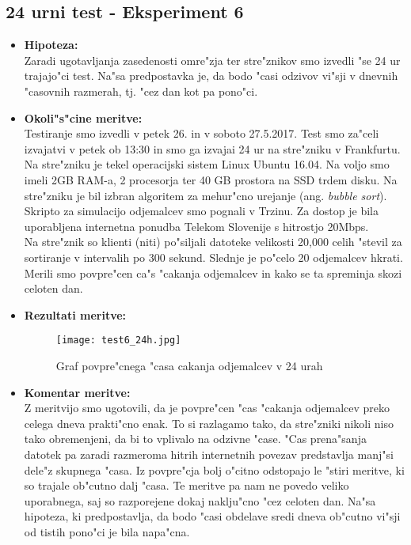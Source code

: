 \newpage
\subsection{24 urni test - Eksperiment 6}
\begin{itemize}
	\item \textbf{Hipoteza: }  \\
		Zaradi ugotavljanja zasedenosti omre"zja ter stre"znikov smo izvedli "se 24 ur trajajo"ci test. Na"sa predpostavka je, da bodo "casi odzivov vi"sji v dnevnih "casovnih razmerah, tj. "cez dan kot pa pono"ci.

	\item \textbf{Okoli"s"cine meritve: } \\
		Testiranje smo izvedli v petek 26. in v soboto 27.5.2017. Test smo za"celi izvajatvi v petek ob 13:30 in smo ga izvajai 24 ur na stre"zniku v Frankfurtu. Na stre"zniku je tekel operacijski sistem Linux Ubuntu 16.04. Na voljo smo imeli 2GB RAM-a, 2 procesorja ter 40 GB prostora na SSD trdem disku. Na stre"zniku je bil izbran algoritem za mehur"cno urejanje (ang. \textit{bubble sort}).\\ Skripto za simulacijo odjemalcev smo pognali v Trzinu. Za dostop je bila uporabljena internetna ponudba Telekom Slovenije s hitrostjo 20Mbps.\\ Na stre"znik so klienti (niti) po"siljali datoteke velikosti 20,000 celih "stevil za sortiranje v intervalih po 300 sekund. Slednje je po"celo 20 odjemalcev hkrati. Merili smo povpre"cen ca"s "cakanja odjemalcev in kako se ta spreminja skozi celoten dan.

 	\item \textbf{Rezultati meritve: }  \\
		\begin{figure}[h]
  		\centering
  		  \texttt{[image: test6\_24h.jpg]}
  		\caption{Graf povpre"cnega "casa cakanja odjemalcev v 24 urah }
  		\label{8_graf_racunska_moc_50}
		\end{figure}

	\item \textbf{Komentar meritve: } \\
		Z meritvijo smo ugotovili, da je povpre"cen "cas "cakanja odjemalcev preko celega dneva prakti"cno enak. To si razlagamo tako, da stre"zniki nikoli niso tako obremenjeni, da bi to vplivalo na odzivne "case. "Cas prena"sanja datotek pa zaradi razmeroma hitrih internetnih povezav predstavlja manj"si dele"z skupnega "casa. Iz povpre"cja bolj o"citno odstopajo le "stiri meritve, ki so trajale ob"cutno dalj "casa. Te meritve pa nam ne povedo veliko uporabnega, saj so razporejene dokaj naklju"cno "cez celoten dan. Na"sa hipoteza, ki predpostavlja, da bodo "casi obdelave sredi dneva ob"cutno vi"sji od tistih pono"ci je bila napa"cna.
\end{itemize}

